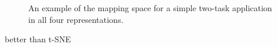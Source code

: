 \begin{figure}[h]
	\centering
\resizebox{1.00\textwidth}{!}{
   \begin{tikzpicture}
     
   \end{tikzpicture}
 }
   \caption{An example of the mapping space for a simple two-task application in all four representations.}
   \label{fig:mapping_space_full}
\end{figure}


\cite{li2018visualizing} better than t-SNE
